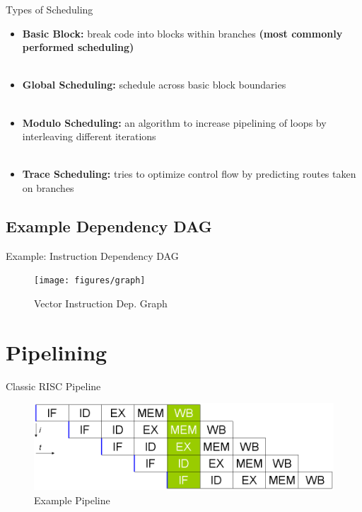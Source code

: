 \documentclass{beamer}
\begin{document}
\begin{darkframes}
\begin{frame}{Types of Scheduling}
\begin{itemize}
	\item {\bf \color{green} Basic Block:} break code into blocks within branches {\bf \color{cyan} (most commonly performed scheduling)} \\
	\qquad \\
	\pause
	\item {\bf \color{green} Global Scheduling:} schedule across basic block boundaries \\
	\qquad \\
	\pause
	\item {\bf \color{green} Modulo Scheduling:} an algorithm to increase pipelining of loops by interleaving different iterations \\
	\qquad \\
	\pause
	\item {\bf \color{green} Trace Scheduling:} tries to optimize control flow by predicting routes taken on branches
\end{itemize}
\end{frame}

\subsection{Example Dependency DAG}
\begin{frame}{Example: Instruction Dependency DAG}
\begin{figure}
\texttt{[image: figures/graph]}
\caption{Vector Instruction Dep. Graph}
\end{figure}
\end{frame}

\section{Pipelining}
\begin{frame}{Classic RISC Pipeline}
\begin{figure}
\includegraphics[scale=0.4]{figures/pipeline}
\caption{Example Pipeline}
\end{figure}
\end{frame}


\end{darkframes}
\end{document}
